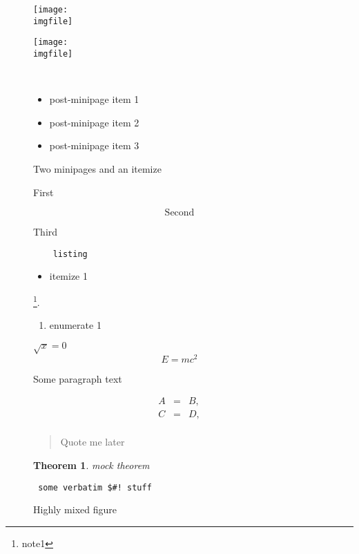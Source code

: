 \documentclass{article}
\newtheorem{theorem}{Theorem}
\def\imgfile{../graphics/none.png}
\begin{document}
\begin{figure}
  \begin{minipage}[t]{0.4\textwidth}
    \texttt{[image: \\imgfile]}
  \end{minipage}
  \begin{minipage}[t]{0.4\textwidth}
    \texttt{[image: \\imgfile]}
  \end{minipage} \\
  \begin{center}\begin{itemize}
    \item post-minipage item 1
    \item post-minipage item 2
    \item post-minipage item 3
  \end{itemize}\end{center}
  \caption{Two minipages and an itemize}
\end{figure}
\clearpage

\begin{figure}
  \begin{center}
  First
  \end{center}
  \[ \mathrm{Second} \]
  \begin{center}
  Third
  \end{center}
\end{figure}
\clearpage

\begin{figure}
  \begin{lstlisting}
    listing
  \end{lstlisting}%
  \begin{itemize}\item itemize 1 \end{itemize}\footnote{note1}.%
  \begin{enumerate}\item enumerate 1 \end{enumerate}%
  $ \sqrt{x} = 0 $%
  \[ E = mc^2 \]%

  Some paragraph text

  \begin{eqnarray*}
    A&=&B,\\
    C&=&D,\\
  \end{eqnarray*}
  \begin{quote}Quote me later\end{quote}%
  \begin{theorem} mock theorem \end{theorem}%
  \begin{verbatim} some verbatim $#! stuff \end{verbatim}%
  \caption{Highly mixed figure}
\end{figure}
\clearpage
\end{document}
